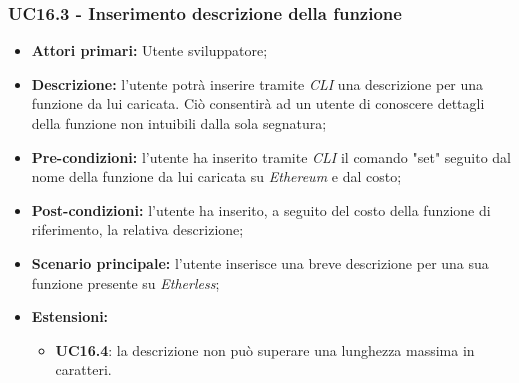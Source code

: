 \subsubsection{UC16.3 - Inserimento descrizione della funzione}
\begin{itemize}
	\item \textbf{Attori primari:} Utente sviluppatore;
	\item \textbf{Descrizione:} l'utente potrà inserire tramite \textit{CLI\glo} una descrizione per una funzione da lui caricata. Ciò consentirà ad un utente di conoscere dettagli della funzione non intuibili dalla sola segnatura; 
	\item \textbf{Pre-condizioni:} l'utente ha inserito tramite \textit{CLI\glo} il comando "set" seguito dal nome della funzione da lui caricata su \textit{Ethereum\glo} e dal costo;
	\item \textbf{Post-condizioni:} l'utente ha inserito, a seguito del costo della funzione di riferimento, la relativa descrizione;
	\item \textbf{Scenario principale:} l'utente inserisce una breve descrizione per una sua funzione presente su \textit{Etherless};
	\item \textbf{Estensioni:} 
	\begin{itemize}
		\item \textbf{UC16.4}: la descrizione non può superare una lunghezza massima in caratteri.
	\end{itemize}
\end{itemize}